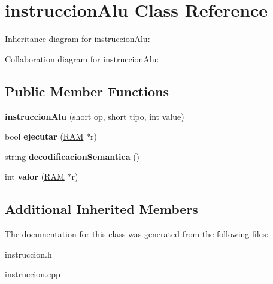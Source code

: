 \hypertarget{classinstruccionAlu}{}\section{instruccion\+Alu Class Reference}
\label{classinstruccionAlu}


Inheritance diagram for instruccion\+Alu\+:


Collaboration diagram for instruccion\+Alu\+:
\subsection*{Public Member Functions}
\begin{DoxyCompactItemize}
\item 
\hypertarget{classinstruccionAlu_ac19116a3105d118d000d250ebe4e7862}{}{\bfseries instruccion\+Alu} (short op, short tipo, int value)\label{classinstruccionAlu_ac19116a3105d118d000d250ebe4e7862}

\item 
\hypertarget{classinstruccionAlu_abe75ff0169b8020b62c0dbce2b73d265}{}bool {\bfseries ejecutar} (\hyperlink{classRAM}{R\+A\+M} $\ast$r)\label{classinstruccionAlu_abe75ff0169b8020b62c0dbce2b73d265}

\item 
\hypertarget{classinstruccionAlu_a7f9a9943e45611007c697cce68494eeb}{}string {\bfseries decodificacion\+Semantica} ()\label{classinstruccionAlu_a7f9a9943e45611007c697cce68494eeb}

\item 
\hypertarget{classinstruccionAlu_ab9ce67685d23774be58619f5f23a4bff}{}int {\bfseries valor} (\hyperlink{classRAM}{R\+A\+M} $\ast$r)\label{classinstruccionAlu_ab9ce67685d23774be58619f5f23a4bff}

\end{DoxyCompactItemize}
\subsection*{Additional Inherited Members}


The documentation for this class was generated from the following files\+:\begin{DoxyCompactItemize}
\item 
instruccion.\+h\item 
instruccion.\+cpp\end{DoxyCompactItemize}
